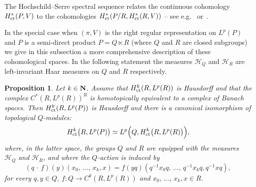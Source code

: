 \documentclass[11pt]{article}
\newtheorem{prop}[theo]{Proposition}
\theoremstyle{definition}
\numberwithin{equation}{section}
\numberwithin{figure}{section}
\numberwithin{table}{section}
\DeclareMathOperator{\ct}{ct}
\begin{document}
The Hochschild--Serre spectral sequence relates the continuous cohomology\linebreak${\rm H}_{\ct} ^*(P, V)$ to the cohomologies ${\rm H}_{\ct} ^*(P/R, {\rm H}_{\ct} ^*(R,V))$ -- see e.g.~\cite[Chapter~IX, Theorem~4.1 p.~178]{BW} or~\cite[Proposition~5.1 p.~214]{Gui}.

In the special case when $(\pi, V)$ is the right regular representation on $L^p(P)$ and $P$ is a semi-direct product $P = Q \ltimes R$ (where $Q$ and $R$ are closed subgroups) we give in this subsection a more comprehensive description of these cohomological spaces. In the following statement the measures $\mathcal H _Q$ and $\mathcal H _R$ are left-invariant Haar measures on $Q$ and $R$ respectively.


\begin{prop}\label{spectral_prop}
Let $k \in {\bf N}$.
Assume that ${\rm H}_{\ct}^k (R, L^p(R))$ is Hausdorff and that the complex $C^*(R, L^p(R))^R$ is homotopically equivalent to a complex of Banach spaces. Then ${\rm H}_{\ct} ^k(R, L^p (P))$ is Hausdorff and there is a canonical isomorphism of topological $Q$-modules:
\[
{\rm H}_{\ct} ^k \big(R, L^p (P)\big) \simeq L^p \Bigl(Q, {\rm H}_{\ct}^k \big(R, L^p (R)\big)\Bigr),
\]
where, in the latter space, the groups $Q$ and $R$ are equipped with the measures $\mathcal H _Q$  and $\mathcal H _R$,  and where the $Q$-action is induced by
\[
(q\,\cdot\,f)(y)(x_0,\,\dots,\,x_k, x) = f(yq)\left(q^{-1} x_0 q,\,\dots,\,q^{-1} x_k q, q^{-1} x q\right),
\]
for every $q, y \in Q$, $f : Q \to C^k (R, L^p(R))$ and $x_0,\,\dots,\,x_k, x \in R$.

\end{prop}
\end{document}
